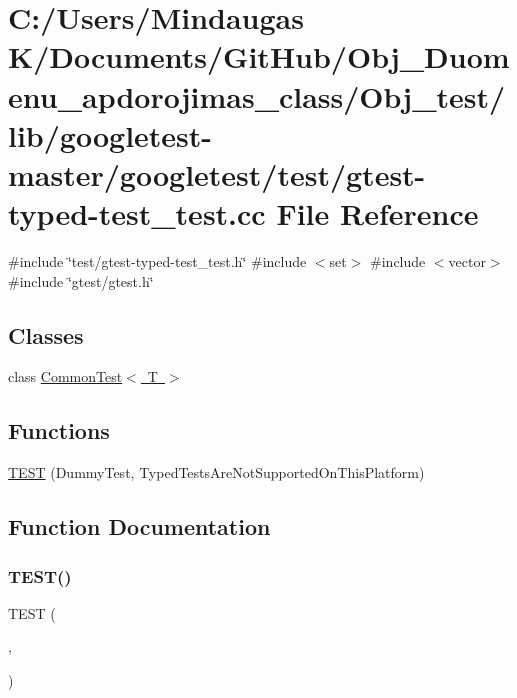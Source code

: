 \hypertarget{_obj__test_2lib_2googletest-master_2googletest_2test_2gtest-typed-test__test_8cc}{}\section{C\+:/\+Users/\+Mindaugas K/\+Documents/\+Git\+Hub/\+Obj\+\_\+\+Duomenu\+\_\+apdorojimas\+\_\+class/\+Obj\+\_\+test/lib/googletest-\/master/googletest/test/gtest-\/typed-\/test\+\_\+test.cc File Reference}
\label{_obj__test_2lib_2googletest-master_2googletest_2test_2gtest-typed-test__test_8cc}
{\ttfamily \#include \char`\"{}test/gtest-\/typed-\/test\+\_\+test.\+h\char`\"{}}\newline
{\ttfamily \#include $<$set$>$}\newline
{\ttfamily \#include $<$vector$>$}\newline
{\ttfamily \#include \char`\"{}gtest/gtest.\+h\char`\"{}}\newline
\subsection*{Classes}
\begin{DoxyCompactItemize}
\item 
class \mbox{\hyperlink{class_common_test}{Common\+Test$<$ T $>$}}
\end{DoxyCompactItemize}
\subsection*{Functions}
\begin{DoxyCompactItemize}
\item 
\mbox{\hyperlink{_obj__test_2lib_2googletest-master_2googletest_2test_2gtest-typed-test__test_8cc_a7d2c906b58ca05100fcea4e00858d2c6}{T\+E\+ST}} (Dummy\+Test, Typed\+Tests\+Are\+Not\+Supported\+On\+This\+Platform)
\end{DoxyCompactItemize}


\subsection{Function Documentation}
\mbox{\label{_obj__test_2lib_2googletest-master_2googletest_2test_2gtest-typed-test__test_8cc_a7d2c906b58ca05100fcea4e00858d2c6}} 
\subsubsection{\texorpdfstring{TEST()}{TEST()}}
{\footnotesize\ttfamily T\+E\+ST (\begin{DoxyParamCaption}\item[{Dummy\+Test}]{,  }\item[{Typed\+Tests\+Are\+Not\+Supported\+On\+This\+Platform}]{ }\end{DoxyParamCaption})}

